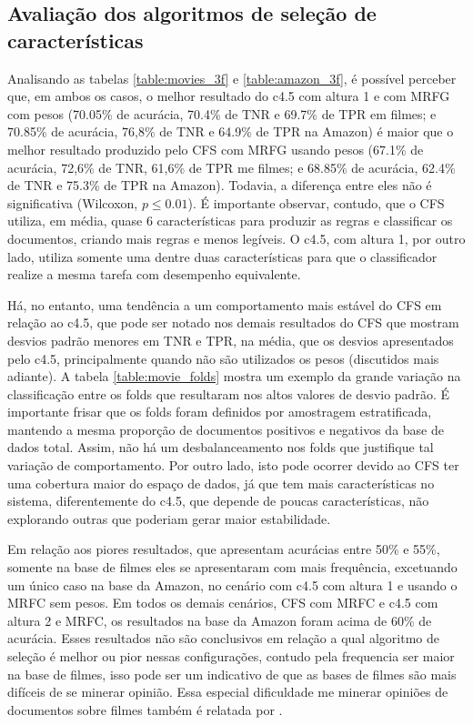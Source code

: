 \documentclass[template.tex]{subfiles}
\begin{document}
\subsection{Avaliação dos algoritmos de seleção de características}

Analisando as tabelas \ref{table:movies_3f} e \ref{table:amazon_3f}, é possível perceber que, em ambos os casos, o melhor resultado do c4.5 com altura 1 e com MRFG com pesos (70.05\% de acurácia, 70.4\% de TNR e 69.7\% de TPR em filmes; e 70.85\% de acurácia, 76,8\% de TNR e 64.9\% de TPR na Amazon) é maior que o melhor resultado produzido pelo CFS com MRFG usando pesos (67.1\% de acurácia, 72,6\% de TNR, 61,6\% de TPR me filmes; e 68.85\% de acurácia, 62.4\% de TNR e 75.3\% de TPR na Amazon). Todavia, a diferença entre eles não é significativa (Wilcoxon, $p\leq0.01$). É importante observar, contudo, que o CFS utiliza, em média, quase 6 características para produzir as regras e classificar os documentos, criando mais regras e menos legíveis. O c4.5, com altura 1, por outro lado, utiliza somente uma dentre duas características para que o classificador realize a mesma tarefa com desempenho equivalente. 
 
Há, no entanto, uma tendência a um comportamento mais estável do CFS em relação ao c4.5, que pode ser notado nos demais resultados do CFS que mostram desvios padrão menores em TNR e TPR,  na média, que os desvios apresentados pelo c4.5, principalmente quando não são utilizados os pesos (discutidos mais adiante). A tabela \ref{table:movie_folds} mostra um exemplo da grande variação na classificação entre os folds que resultaram nos altos valores de desvio padrão. É importante frisar que os folds foram definidos por amostragem estratificada, mantendo a mesma proporção de documentos positivos e negativos da base de dados total. Assim, não há um desbalanceamento nos folds que justifique tal variação de comportamento. Por outro lado, isto pode ocorrer devido ao CFS ter uma cobertura maior do espaço de dados, já que tem mais características no sistema, diferentemente do c4.5, que depende de poucas características, não explorando outras que poderiam gerar maior estabilidade.

Em relação aos piores resultados, que apresentam acurácias entre 50\% e 55\%, somente na base de filmes eles se apresentaram com mais frequência, excetuando um único caso na base da Amazon, no cenário com c4.5 com altura 1 e usando o MRFC sem pesos. Em todos os demais cenários, CFS com MRFC e c4.5 com altura 2 e MRFC, os resultados na base da Amazon foram acima de 60\% de acurácia. Esses resultados não são conclusivos em relação a qual algoritmo de seleção é melhor ou pior nessas configurações, contudo pela frequencia ser maior na base de filmes, isso pode ser um indicativo de que as bases de filmes são mais difíceis de se minerar opinião. Essa especial dificuldade me minerar opiniões de documentos sobre filmes também é relatada por  .
\end{document}

